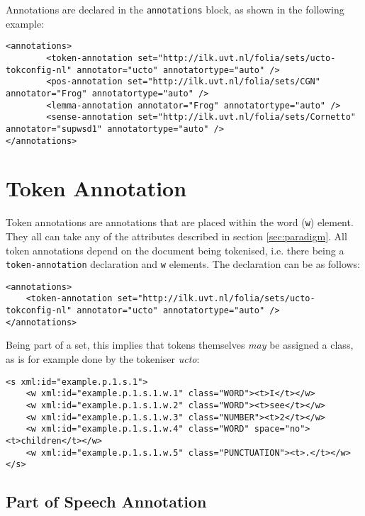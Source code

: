 \documentclass[a4paper,12pt]{article}
\begin{document}
Annotations are declared in the \texttt{annotations} block, as shown in the following example:

\begin{verbatim}
<annotations>
        <token-annotation set="http://ilk.uvt.nl/folia/sets/ucto-tokconfig-nl" annotator="ucto" annotatortype="auto" />
        <pos-annotation set="http://ilk.uvt.nl/folia/sets/CGN" annotator="Frog" annotatortype="auto" />
        <lemma-annotation annotator="Frog" annotatortype="auto" />    
        <sense-annotation set="http://ilk.uvt.nl/folia/sets/Cornetto" annotator="supwsd1" annotatortype="auto" />    
</annotations>
\end{verbatim}


\section{Token Annotation}

Token annotations are annotations that are placed within the word (\texttt{w}) element. They all can take any of the attributes described in section \ref{sec:paradigm}. All token annotations depend on the document being tokenised, i.e. there being a \texttt{token-annotation} declaration and \texttt{w} elements. The declaration can be as follows:

\begin{verbatim}
<annotations>
    <token-annotation set="http://ilk.uvt.nl/folia/sets/ucto-tokconfig-nl" annotator="ucto" annotatortype="auto" />
</annotations>
\end{verbatim}

Being part of a set, this implies that tokens themselves \emph{may} be assigned a class, as is for example done by the tokeniser \emph{ucto}:

\begin{verbatim}
<s xml:id="example.p.1.s.1">
    <w xml:id="example.p.1.s.1.w.1" class="WORD"><t>I</t></w>
    <w xml:id="example.p.1.s.1.w.2" class="WORD"><t>see</t></w>
    <w xml:id="example.p.1.s.1.w.3" class="NUMBER"><t>2</t></w>
    <w xml:id="example.p.1.s.1.w.4" class="WORD" space="no"><t>children</t></w>
    <w xml:id="example.p.1.s.1.w.5" class="PUNCTUATION"><t>.</t></w>
</s>
\end{verbatim}        


\subsection{Part of Speech Annotation}
\end{document}
